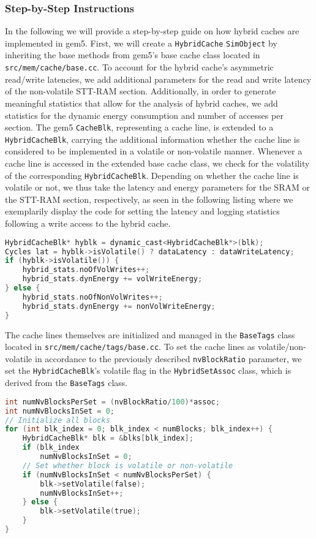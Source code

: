 \subsubsection{Step-by-Step Instructions}
In the following we will provide a step-by-step guide on how hybrid caches are implemented in gem5.
First, we will create a \texttt{HybridCache} \texttt{SimObject} by inheriting the base methods from gem5's base cache class located in \texttt{src/mem/cache/base.cc}.
To account for the hybrid cache's asymmetric read/write latencies, we add additional parameters for the read and write latency of the non-volatile STT-RAM section.
Additionally, in order to generate meaningful statistics that allow for the analysis of hybrid caches, we add statistics for the dynamic energy consumption and number of accesses per section.
The gem5 \texttt{CacheBlk}, representing a cache line, is extended to a \texttt{HybridCacheBlk}, carrying the additional information whether the cache line is considered to be implemented in a volatile or non-volatile manner.
Whenever a cache line is accessed in the extended base cache class, we check for the volatility of the corresponding \texttt{HybridCacheBlk}.
Depending on whether the cache line is volatile or not, we thus take the latency and energy parameters for the SRAM or the STT-RAM section, respectively, as seen in the following listing where we exemplarily display the code for setting the latency and logging statistics following a write access to the hybrid cache.
\begin{lstlisting}[language=C]
HybridCacheBlk* hyblk = dynamic_cast<HybridCacheBlk*>(blk);
Cycles lat = hyblk->isVolatile() ? dataLatency : dataWriteLatency;
if (hyblk->isVolatile()) {
	hybrid_stats.noOfVolWrites++;
	hybrid_stats.dynEnergy += volWriteEnergy;
} else {
	hybrid_stats.noOfNonVolWrites++;
	hybrid_stats.dynEnergy += nonVolWriteEnergy;
}
\end{lstlisting}
The cache lines themselves are initialized and managed in the \texttt{BaseTags} class located in \texttt{src/mem/cache/tags/base.cc}.
To set the cache lines as volatile/non-volatile in accordance to the previously described \texttt{nvBlockRatio} parameter, we set the \texttt{HybridCacheBlk}'s volatile flag in the \texttt{HybridSetAssoc} class, which is derived from the \texttt{BaseTags} class.
\begin{lstlisting}[language=C]
int numNvBlocksPerSet = (nvBlockRatio/100)*assoc;
int numNvBlocksInSet = 0;
// Initialize all blocks
for (int blk_index = 0; blk_index < numBlocks; blk_index++) {
    HybridCacheBlk* blk = &blks[blk_index];
    if (blk_index 
        numNvBlocksInSet = 0;
    // Set whether block is volatile or non-volatile
    if (numNvBlocksInSet < numNvBlocksPerSet) {
        blk->setVolatile(false);
        numNvBlocksInSet++;
    } else {
        blk->setVolatile(true);
    }
}
\end{lstlisting}
